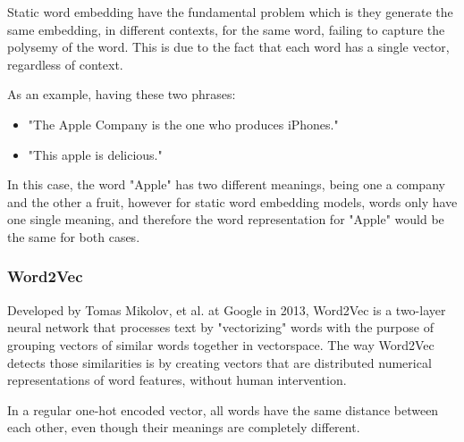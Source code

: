     \par Static word embedding have the fundamental problem which is they generate the same embedding, in different contexts, for the same word, failing to capture the polysemy of the word. This is due to the fact that each word has a single vector, regardless of context. \cite{Mikolov2013}  
   

    \par As an example, having these two phrases:

    \begin{itemize}
        \item "The Apple Company is the one who produces iPhones."
        \item "This apple is delicious."
    \end{itemize}

    \par In this case, the word "Apple" has two different meanings, being one a company and the other a fruit, however for static word embedding models, words only have one single meaning, and therefore  the word representation for "Apple" would be the same for both cases. \cite{Batista2018}

   
        \subsubsection{Word2Vec}

        \par Developed by Tomas Mikolov, et al. at Google in 2013, Word2Vec is a two-layer neural network that processes text by "vectorizing" words with the purpose of grouping vectors of similar words together in vectorspace. The way Word2Vec detects those similarities is by creating vectors that are distributed numerical representations of word features, without human intervention.


        \par In a regular one-hot encoded vector, all words have the same distance between each other, even though their meanings are completely different.

